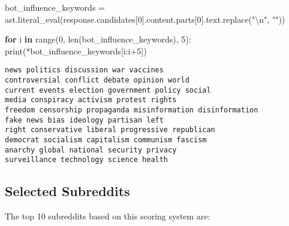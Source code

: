 \documentclass[
  letterpaper,
  DIV=11,
  numbers=noendperiod]{scrartcl}
\newenvironment{Shaded}{\begin{snugshade}}{\end{snugshade}}
\newcommand{\BuiltInTok}[1]{\textcolor[rgb]{0.00,0.23,0.31}{#1}}
\newcommand{\CharTok}[1]{\textcolor[rgb]{0.13,0.47,0.30}{#1}}
\newcommand{\ControlFlowTok}[1]{\textcolor[rgb]{0.00,0.23,0.31}{\textbf{#1}}}
\newcommand{\DecValTok}[1]{\textcolor[rgb]{0.68,0.00,0.00}{#1}}
\newcommand{\KeywordTok}[1]{\textcolor[rgb]{0.00,0.23,0.31}{\textbf{#1}}}
\newcommand{\NormalTok}[1]{\textcolor[rgb]{0.00,0.23,0.31}{#1}}
\newcommand{\OperatorTok}[1]{\textcolor[rgb]{0.37,0.37,0.37}{#1}}
\newcommand{\StringTok}[1]{\textcolor[rgb]{0.13,0.47,0.30}{#1}}
\begin{document}
\begin{Shaded}
\begin{Highlighting}[]
\NormalTok{bot\_influence\_keywords }\OperatorTok{=}\NormalTok{ ast.literal\_eval(response.candidates[}\DecValTok{0}\NormalTok{].content.parts[}\DecValTok{0}\NormalTok{].text.replace(}\StringTok{"}\CharTok{\textbackslash{}n}\StringTok{"}\NormalTok{, }\StringTok{""}\NormalTok{))}

\ControlFlowTok{for}\NormalTok{ i }\KeywordTok{in} \BuiltInTok{range}\NormalTok{(}\DecValTok{0}\NormalTok{, }\BuiltInTok{len}\NormalTok{(bot\_influence\_keywords), }\DecValTok{5}\NormalTok{):}
    \BuiltInTok{print}\NormalTok{(}\OperatorTok{*}\NormalTok{bot\_influence\_keywords[i:i}\OperatorTok{+}\DecValTok{5}\NormalTok{])}
\end{Highlighting}
\end{Shaded}

\begin{verbatim}
news politics discussion war vaccines
controversial conflict debate opinion world
current events election government policy social
media conspiracy activism protest rights
freedom censorship propaganda misinformation disinformation
fake news bias ideology partisan left
right conservative liberal progressive republican
democrat socialism capitalism communism fascism
anarchy global national security privacy
surveillance technology science health
\end{verbatim}

\subsection{Selected Subreddits}\label{selected-subreddits}

The top 10 subreddits based on this scoring system are:
\end{document}
